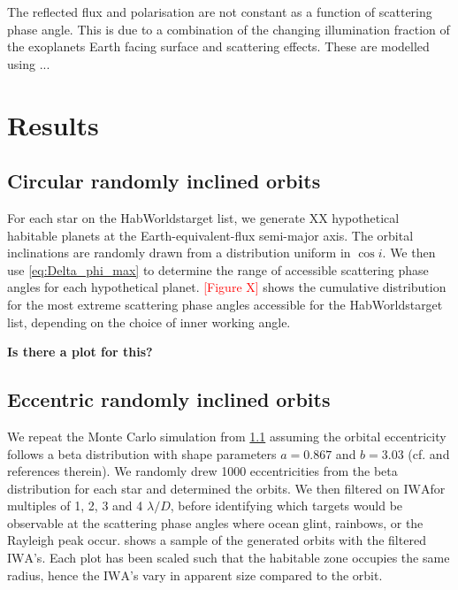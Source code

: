 \documentclass[
    usenatbib,
]{mnras}
\newcommand{\todo}[1]{\textcolor{red}{[#1]}}
\newcommand{\IWA}{\ensuremath{\mathrm{IWA}}}
\newcommand{\hwo}{HabWorlds}
\begin{document}
The reflected flux and polarisation are not constant as a function of scattering phase angle. This is due to a combination of the changing illumination fraction of the exoplanets Earth facing surface and scattering effects. These are modelled using ...

\section{Results}

\subsection{Circular randomly inclined orbits}
\label{sec:circular}
For each star on the \hwo target list, we generate XX hypothetical habitable planets at the Earth-equivalent-flux semi-major axis. The orbital inclinations are randomly drawn from a distribution uniform in $\cos i$. 
We then use \cref{eq:Delta_phi_max} to determine the range of accessible scattering phase angles for each hypothetical planet. 
\todo{Figure X} shows the cumulative distribution for the most extreme scattering phase angles accessible for the \hwo target list, depending on the choice of inner working angle.  

\textbf{Is there a plot for this?}

\subsection{Eccentric randomly inclined orbits}
\label{sec:eccentric}
We repeat the Monte Carlo simulation from \cref{sec:circular} assuming the orbital eccentricity follows a beta distribution with shape parameters $a=0.867$ and $b=3.03$ (cf. \citet{Guimond_2019} and references therein). 
We randomly drew 1000 eccentricities from the beta distribution for each star and determined the orbits. 
We then filtered on \IWA for multiples of 1, 2, 3 and 4 $\lambda / D$, before identifying which targets would be observable at the scattering phase angles where ocean glint, rainbows, or the Rayleigh peak occur. 
 shows a sample of the generated orbits with the filtered \IWA's. 
Each plot has been scaled such that the habitable zone occupies the same radius, hence the \IWA's vary in apparent size compared to the orbit. 
\end{document}

